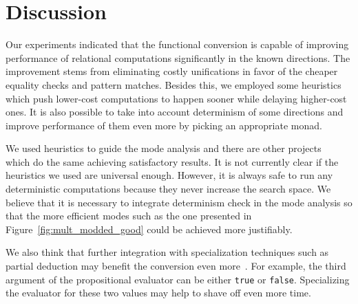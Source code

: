 \section{Discussion}
\label{sec:discussion}

Our experiments indicated that the functional conversion is capable of improving performance of relational computations significantly in the known directions.
The improvement stems from eliminating costly unifications in favor of the cheaper equality checks and pattern matches.
Besides this, we employed some heuristics which push lower-cost computations to happen sooner while delaying higher-cost ones.
It is also possible to take into account determinism of some directions and improve performance of them even more by picking an appropriate monad.

We used heuristics to guide the mode analysis and there are other projects~\cite{lukacsy2008semantic, bulwahn2011smart} which do the same achieving  satisfactory results.
It is not currently clear if the heuristics we used are universal enough.
However, it is always safe to run any deterministic computations because they never increase the search space.
We believe that it is necessary to integrate determinism check in the mode analysis so that the more efficient modes such as the one presented in Figure~\ref{fig:mult_modded_good} could be achieved more justifiably.

We also think that further integration with specialization techniques such as partial deduction may benefit the conversion even more~\cite{verbitskaia2021empirical}.
For example, the third argument of the propositional evaluator can be either \lstinline{true} or \lstinline{false}.
Specializing the evaluator for these two values may help to shave off even more time.
